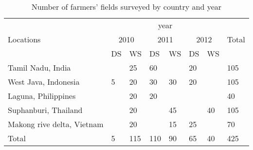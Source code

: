 \begin{table}
\centering
    \begin{tabular}{llllllll}
    \hline
    \multirow{3}{*}{Locations} & \multicolumn{6}{c}{year} & \multirow{3}{*}{Total} \\ \cline{2-7}
                         & \multicolumn{2}{c}{2010} & \multicolumn{2}{c}{2011} & \multicolumn{2}{c}{2012} &     \\ \cline{2-7}
                         & DS         & WS         & DS          & WS         & DS          & WS         &     \\
                        \hline
        Tamil Nadu, India           &            & 25          & 60          &            & 20          &            & 105  \\
        West Java, Indonesia       & 5          & 20          & 30          & 30         & 20          &            & 105  \\
        Laguna, Philippines     &            & 20          & 20          &            &             &            & 40   \\
        Suphanburi, Thailand        &            & 20          &             & 45         &             & 40         & 105  \\
        Makong rive delta, Vietnam         &            & 20          &             & 15         & 25          &            & 70   \\
                        \hline
        Total           & 5          & 115         & 110         & 90         & 65          & 40         & 425   \\
        \hline               
    \end{tabular}
    \caption{Number of farmers' fields surveyed by country and year}
    \label{table:Survey_data}
\end{table}